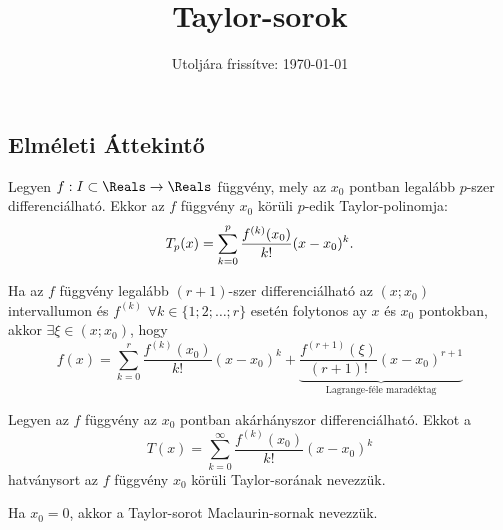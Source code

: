 \documentclass[a4paper, 12pt]{scrartcl}
\title{Taylor-sorok}
\date{Utoljára frissítve: \today}
\begin{document}
\maketitle
\subsection{Elméleti Áttekintő}

\begin{definition}
  Legyen $f: I \subset \Reals \to \Reals$ függvény, mely az $x_0$ pontban
  legalább $p$-szer differenciálható. Ekkor az $f$ függvény $x_0$ körüli
  $p$-edik Taylor-polinomja:
  $$
    T_p(x) = \sum_{k=0}^{p} \frac{f^{(k)}(x_0)}{k!} (x - x_0)^k
    \text.
  $$
\end{definition}

\begin{theorem}
  Ha az $f$ függvény legalább $(r + 1)$-szer differenciálható az $(x; x_0)$
  intervallumon és $f^{(k)}$ $\forall k \in \{1;2;\dots;r\}$ esetén folytonos
  ay $x$ és $x_0$ pontokban, akkor $\exists \xi \in (x; x_0)$, hogy
  $$
    f(x)
    = \sum_{k=0}^{r} \frac{f^{(k)}(x_0)}{k!} (x - x_0)^k
    + \underbrace{\frac{f^{(r+1)}(\xi)}{(r+1)!} (x - x_0)^{r+1}}_{\text{Lagrange-féle maradéktag}}
  $$
\end{theorem}

\begin{definition}
  Legyen az $f$ függvény az $x_0$ pontban akárhányszor differenciálható. Ekkot a
  $$
    T(x) = \sum_{k=0}^{\infty} \frac{f^{(k)}(x_0)}{k!} (x - x_0)^k
  $$
  hatványsort az $f$ függvény $x_0$ körüli Taylor-sorának nevezzük.
\end{definition}

\begin{note}
  Ha $x_0 = 0$, akkor a Taylor-sorot Maclaurin-sornak nevezzük.
\end{note}
\end{document}
